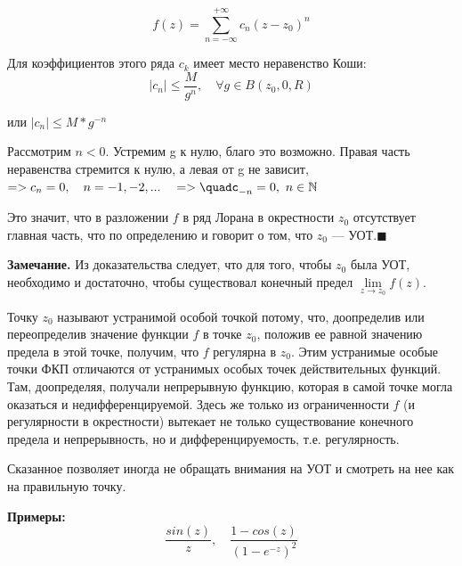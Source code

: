\documentclass[a4paper, 12pt]{report}
\begin{document}
$$f(z)=\sum\limits_{n=-\infty}^{+\infty} c_n (z-z_0)^n$$

Для коэффициентов этого ряда $c_k$ имеет место неравенство Коши:
$$|c_n|\leqslant \frac{M}{g^n}, \quad \forall g\in B(z_0,0,R)$$

или $|c_n|\leqslant M*g^{-n}$
\par\bigskip
Рассмотрим $n<0$. Устремим g к нулю, благо это возможно. Правая часть неравенства стремится к нулю, а левая от g не зависит, $=> c_n=0, \quad n=-1,-2,...\quad=>\quadc_{-n}=0,\ n\in \mathbb{N}$
\par\bigskip
Это значит, что в разложении $f$ в ряд Лорана в окрестности $z_0$ отсутствует главная часть, что по определению и говорит о том, что $z_0$ --- УОТ.\quad $\blacksquare$
\par\bigskip
\textbf{Замечание.} \quad Из доказательства следует, что для того, чтобы $z_0$ была УОТ, необходимо и достаточно, чтобы существовал конечный предел $\lim\limits_{z\to z_0} f(z)$.

\par\bigskip
Точку $z_0$ называют устранимой особой точкой потому, что, доопределив или переопределив значение функции $f$ в точке $z_0$, положив ее равной значению предела в этой точке, получим, что $f$ регулярна в $z_0$. Этим устранимые особые точки ФКП отличаются от устранимых особых точек действительных функций. Там, доопределяя, получали непрерывную функцию, которая в самой точке могла оказаться и недифференцируемой. Здесь же только из ограниченности $f$ (и регулярности в окрестности) вытекает не только существование конечного предела и непрерывность, но и дифференцируемость, т.е. регулярность.
\par\bigskip
Сказанное позволяет иногда не обращать внимания на УОТ и смотреть на нее как на правильную точку.
\par\bigskip
\textbf{Примеры:} $$\frac{sin(z)}{z}, \quad \frac{1-cos(z)}{(1-e^{-z})^2}$$
\end{document}
